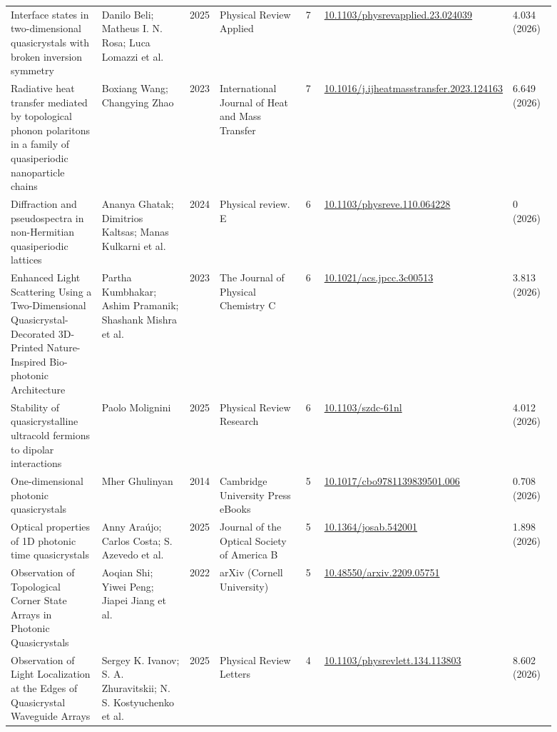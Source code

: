 \documentclass[10pt,a4paper]{article}
\begin{document}
{\begin{longtable}{p{0.192\linewidth}p{0.192\linewidth}p{0.043\linewidth}p{0.192\linewidth}p{0.043\linewidth}p{0.132\linewidth}p{0.096\linewidth}}
Interface states in two-dimensional quasicrystals with broken inversion symmetry & Danilo Beli; Matheus I. N. Rosa; Luca Lomazzi et al. & 2025 & Physical Review Applied & 7 & \href{https://doi.org/10.1103/physrevapplied.23.024039}{10.1103/physrevapplied.23.024039} & 4.034 (2026) \\
Radiative heat transfer mediated by topological phonon polaritons in a family of quasiperiodic nanoparticle chains & Boxiang Wang; Changying Zhao & 2023 & International Journal of Heat and Mass Transfer & 7 & \href{https://doi.org/10.1016/j.ijheatmasstransfer.2023.124163}{10.1016/j.ijheatmasstransfer.2023.124163} & 6.649 (2026) \\
Diffraction and pseudospectra in non-Hermitian quasiperiodic lattices & Ananya Ghatak; Dimitrios Kaltsas; Manas Kulkarni et al. & 2024 & Physical review. E & 6 & \href{https://doi.org/10.1103/physreve.110.064228}{10.1103/physreve.110.064228} & 0 (2026) \\
Enhanced Light Scattering Using a Two-Dimensional Quasicrystal-Decorated 3D-Printed Nature-Inspired Bio-photonic Architecture & Partha Kumbhakar; Ashim Pramanik; Shashank Mishra et al. & 2023 & The Journal of Physical Chemistry C & 6 & \href{https://doi.org/10.1021/acs.jpcc.3c00513}{10.1021/acs.jpcc.3c00513} & 3.813 (2026) \\
Stability of quasicrystalline ultracold fermions to dipolar interactions & Paolo Molignini & 2025 & Physical Review Research & 6 & \href{https://doi.org/10.1103/szdc-61nl}{10.1103/szdc-61nl} & 4.012 (2026) \\
One-dimensional photonic quasicrystals & Mher Ghulinyan & 2014 & Cambridge University Press eBooks & 5 & \href{https://doi.org/10.1017/cbo9781139839501.006}{10.1017/cbo9781139839501.006} & 0.708 (2026) \\
Optical properties of 1D photonic time quasicrystals & Anny Araújo; Carlos Costa; S. Azevedo et al. & 2025 & Journal of the Optical Society of America B & 5 & \href{https://doi.org/10.1364/josab.542001}{10.1364/josab.542001} & 1.898 (2026) \\
Observation of Topological Corner State Arrays in Photonic Quasicrystals & Aoqian Shi; Yiwei Peng; Jiapei Jiang et al. & 2022 & arXiv (Cornell University) & 5 & \href{https://doi.org/10.48550/arxiv.2209.05751}{10.48550/arxiv.2209.05751} &  \\
Observation of Light Localization at the Edges of Quasicrystal Waveguide Arrays & Sergey K. Ivanov; S. A. Zhuravitskii; N. S. Kostyuchenko et al. & 2025 & Physical Review Letters & 4 & \href{https://doi.org/10.1103/physrevlett.134.113803}{10.1103/physrevlett.134.113803} & 8.602 (2026) \\

\end{longtable}}
\end{document}

